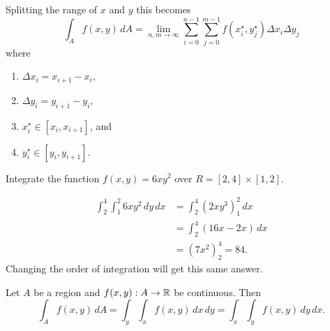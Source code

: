 Splitting the range of $x$ and $y$ this becomes
\[
    \int_A f(x, y) \, dA =
    \lim_{n, m \to \infty} \sum^{n - 1}_{i = 0} \sum^{m - 1}_{j = 0} 
    f(x_i^\star, y_j^\star) \Delta x_i \Delta y_j
\]
where
\begin{enumerate}
    \item $\Delta x_i = x_{i+1} - x_i$,
    \item $\Delta y_i = y_{i+1} - y_i$,
    \item $x^\star_i \in [x_i, x_{i+1}]$, and
    \item $y^\star_i \in [y_i, y_{i+1}]$.
\end{enumerate}

\begin{example}
    Integrate the function $f(x, y) = 6xy^2$ over $R = [2, 4] \times [1, 2]$.
\end{example}

\begin{solution}
    \begin{align*}
        \int_2^4\int_1^2 6xy^2 \, dy \, dx
        &= \int_2^4 \left(2xy^3\right)^2_1 \, dx \\
        &= \int_2^4 (16x - 2x) \, dx \\
        &= \left(7x^2\right)^4_2 = 84.
    \end{align*}
    Changing the order of integration will get this same answer.
\end{solution}

\begin{theorem}
    Let $A$ be a region and $f(x, y): A \to \mathbb{R}$ be continuous.
    Then
    \[
        \int_A f(x, y) \, dA
        = \int_y \int_x f(x, y) \, dx \, dy
        = \int_x \int_y f(x, y) \, dy \, dx.
    \]
\end{theorem}
